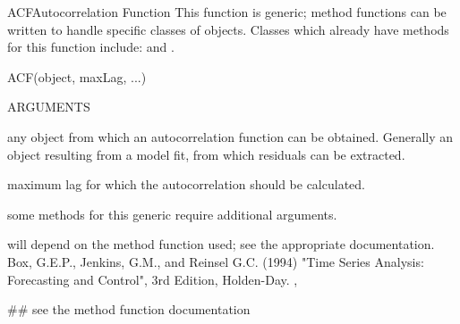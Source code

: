\documentclass[pdftex]{article} \usepackage{url,graphicx}
\begin{document}
\begin{Helpfile}{ACF}{Autocorrelation Function}
This function is generic; method functions can be written to handle
specific classes of objects. Classes which already have methods for
this function include:  and  .
\begin{Example}
ACF(object, maxLag, ...)
\end{Example}
\begin{Argument}{ARGUMENTS}
\item[\Co{object:}]
any object from which an autocorrelation function can be
obtained. Generally an object resulting from a model fit, from which
residuals can be extracted.
\item[\Co{maxLag:}]
maximum lag for which the autocorrelation should be
calculated.
\item[\Co{...:}]
some methods for this generic require additional
arguments.
\end{Argument}
will depend on the method function used; see the appropriate documentation.
Box, G.E.P., Jenkins, G.M., and Reinsel G.C. (1994) "Time Series
Analysis: Forecasting and Control", 3rd Edition, Holden-Day.
, 
\need 15pt
\vspace{-16pt}
\begin{Example}
## see the method function documentation
\end{Example}
\end{Helpfile}
\end{document}
